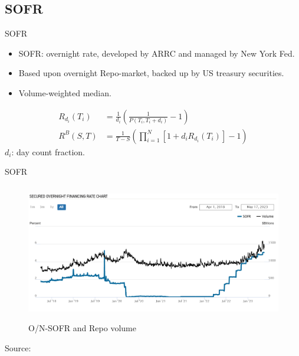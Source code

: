 \documentclass[UKenglish]{beamer}
\begin{document}
\subsection{SOFR}
\begin{frame}{SOFR}
\begin{itemize}
    \item SOFR: overnight rate, developed by ARRC and managed by New York Fed.
    \item Based upon overnight Repo-market, backed up by US treasury securities. 
    \item Volume-weighted median. 
\end{itemize} 

\begin{definition}
\begin{align*}
R_{d_{i}}(T_{i}) &= \frac{1}{d_{i}}\left(
\frac{1}{P(T_{i}, T_{i}+d_{i})} - 1
\right) \\ 
R^{B}(S,T) &= \frac{1}{T-S}\left(
\prod_{i=1}^{N}[1+d_{i}R_{d_{i}}(T_{i})] - 1
\right)
\end{align*}
$d_{i}$: day count fraction. 

\end{definition}

\end{frame}


\begin{frame}{SOFR}
\begin{figure}[htp]
    \centering
    \includegraphics[height = 6cm, width=12cm]{SOFR/SOFR_Repo.PNG}
    \caption{O/N-SOFR and Repo volume}
\end{figure}
Source: 
\end{frame}
\end{document}
